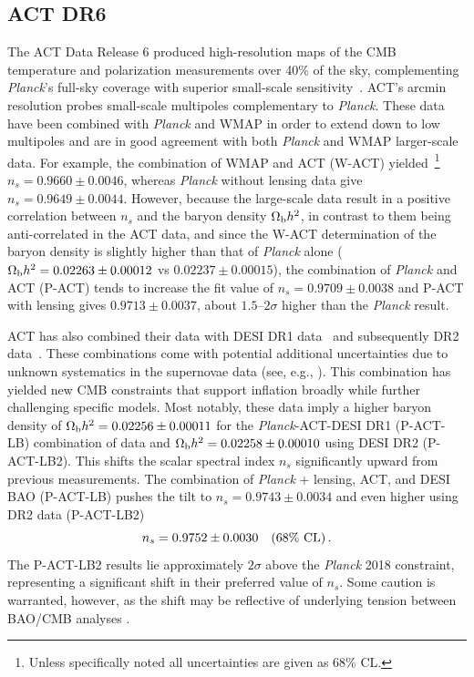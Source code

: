\documentclass[aps,prev,twocolumn,preprintnumbers,floatfix,nofootinbib]{revtex4-1}
\newcommand{\beq}{\begin{equation}}
\newcommand{\eeq}{\end{equation}}
\begin{document}
\subsection*{ACT DR6}
The ACT Data Release 6 produced high-resolution maps of the CMB temperature and polarization measurements over 40\% of the sky, complementing \textit{Planck}'s full-sky coverage with superior small-scale sensitivity~\cite{ACT:2025fju,ACT:2025tim}. ACT's arcmin resolution probes small-scale multipoles complementary to \textit{Planck}. These data have been combined with {\it Planck} and WMAP in order to extend down to low multipoles and are in good agreement with both {\it Planck} and WMAP  larger-scale data. For example, the combination of WMAP and ACT (W-ACT) yielded~\footnote{Unless specifically noted all uncertainties are given as 68\% CL. } $n_s = 0.9660 \pm 0.0046$, whereas {\it Planck} without lensing data give $n_s = 0.9649 \pm 0.0044$. However, because the large-scale data result in a positive correlation between $n_s$ and the baryon density $\Omega_{\rm b} h^2$, in contrast to them being anti-correlated in the ACT data, and since the W-ACT determination of the baryon density is
slightly higher than that of {\it Planck} alone ($\Omega_{\rm b} h^2 = 0.02263 \pm 0.00012$ vs $0.02237 \pm 0.00015$), the combination of {\it Planck} and ACT (P-ACT) tends to increase the fit value of $n_s = 0.9709 \pm 0.0038$ and P-ACT with lensing gives $0.9713 \pm 0.0037$, about $1.5$--$2\sigma$ higher than the {\it Planck} result. 

ACT has also combined their data with DESI DR1 data~\cite{DESI:2024uvr, DESI:2024mwx} and subsequently DR2 data~\cite{DESI:2025zpo,DESI:2025zgx}. These combinations come with potential additional uncertainties due to unknown systematics in the supernovae data (see, e.g., \cite{dovekie}). This combination has yielded new CMB constraints that support inflation broadly while further challenging specific models. Most notably, these data imply a higher baryon density of $\Omega_{\rm b} h^2 = 0.02256 \pm 0.00011$ for the {\it Planck}-ACT-DESI DR1 (P-ACT-LB) combination of data and $\Omega_{\rm b} h^2 = 0.02258 \pm 0.00010$ using DESI DR2 (P-ACT-LB2). This shifts the scalar spectral index $n_s$ significantly upward from previous measurements. 
The combination of \textit{Planck} + lensing, ACT, and DESI BAO (P-ACT-LB) pushes the tilt to $n_s = 0.9743 \pm 0.0034$ and  even higher  using DR2 data (P-ACT-LB2)
\cite{ACT:2025fju}
\beq
n_s = 0.9752 \pm 0.0030~~~ (68\% {\rm~CL}) \, .
\label{nsact}
\eeq
 The P-ACT-LB2 results lie approximately $2\sigma$ above the {\it Planck} 2018 constraint, representing a significant shift in their preferred value of $n_s$.
Some caution is warranted, however, as the shift may be reflective of underlying tension between BAO/CMB analyses \cite{Ferreira:2025lrd}.
\end{document}
